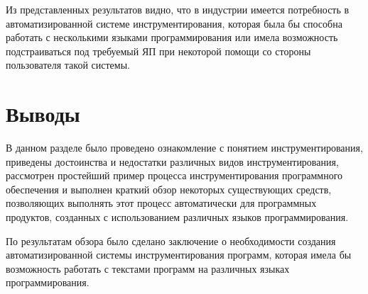 Из представленных результатов видно, что в индустрии имеется потребность в автоматизированной системе инструментирования, которая была бы способна работать с несколькими языками программирования или имела возможность подстраиваться под требуемый ЯП при некоторой помощи со стороны пользователя такой системы.

\section{Выводы}

В данном разделе было проведено ознакомление с понятием инструментирования, приведены достоинства и недостатки различных видов инструментирования, рассмотрен простейший пример процесса инструментирования программного обеспечения и выполнен краткий обзор некоторых существующих средств, позволяющих выполнять этот процесс автоматически для программных продуктов, созданных с использованием различных языков программирования.

По результатам обзора было сделано заключение о необходимости создания автоматизированной системы инструментирования программ, которая имела бы возможность работать с текстами программ на различных языках программирования.
